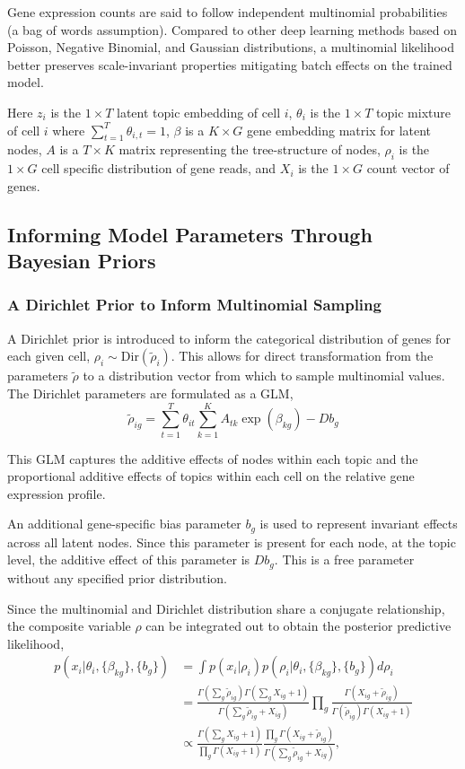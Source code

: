 Gene expression counts are said to follow independent multinomial probabilities (a bag of words assumption). Compared to other deep learning methods based on Poisson, Negative Binomial, and Gaussian distributions, a multinomial likelihood better preserves scale-invariant properties mitigating batch effects on the trained model. 

Here $z_i$ is the $1 \times T$ latent topic embedding of cell $i$, $\theta_i$ is the $1 \times T$ topic mixture of cell $i$ where $\sum_{t = 1}^T\theta_{i,t} = 1$, $\beta$ is a $K \times G$ gene embedding matrix for latent nodes, $A$ is a $T \times K$ matrix representing the tree-structure of nodes, $\rho_i$ is the $1 \times G$ cell specific distribution of gene reads, and $X_i$ is the $1 \times G$ count vector of genes. 

\subsection{Informing Model Parameters Through Bayesian Priors}
\subsubsection{A Dirichlet Prior to Inform Multinomial Sampling}

A Dirichlet prior is introduced to inform the categorical distribution of genes for each given cell, $\rho_i \sim \text{Dir}(\tilde{\rho}_i)$. This allows for direct transformation from the parameters $\tilde{\rho}$ to a distribution vector from which to sample multinomial values. The Dirichlet parameters are formulated as a GLM,
\begin{equation*}
    \tilde{\rho}_{ig} = \sum_{t = 1}^T\theta_{it}\sum_{k = 1}^K A_{tk}\exp(\beta_{kg}) - Db_g
\end{equation*}

This GLM captures the additive effects of nodes within each topic and the proportional additive effects of topics within each cell on the relative gene expression profile. 

An additional gene-specific bias parameter $b_g$ is used to represent invariant effects across all latent nodes. Since this parameter is present for each node, at the topic level, the additive effect of this parameter is $Db_g$. This is a free parameter without any specified prior distribution.
 
Since the multinomial and Dirichlet distribution share a conjugate relationship, the composite variable $\rho$ can be integrated out to obtain the posterior predictive likelihood, 
\begin{align*}
    p(x_i | \theta_i, \{\beta_{kg}\}, \{b_g\}) &= \int p(x_i | \rho_i)p(\rho_i | \theta_i, \{\beta_{kg}\}, \{b_g\})d\rho_i\\
    &= \frac{\Gamma(\sum_g \tilde{\rho}_{ig})\Gamma(\sum_g X_{ig} + 1)}{\Gamma(\sum_g \tilde{\rho}_{ig} + X_{ig})}\prod_g\frac{\Gamma(X_{ig} + \tilde{\rho}_{ig})}{\Gamma(\tilde{\rho}_{ig}) \Gamma(X_{ig} + 1)}\\
    &\propto \frac{\Gamma(\sum_g X_{ig} + 1)}{\prod_g \Gamma(X_{ig} + 1)}\frac{\prod_g\Gamma(X_{ig} + \tilde{\rho}_{ig})}{\Gamma(\sum_g \tilde{\rho}_{ig} + X_{ig})},
\end{align*}

